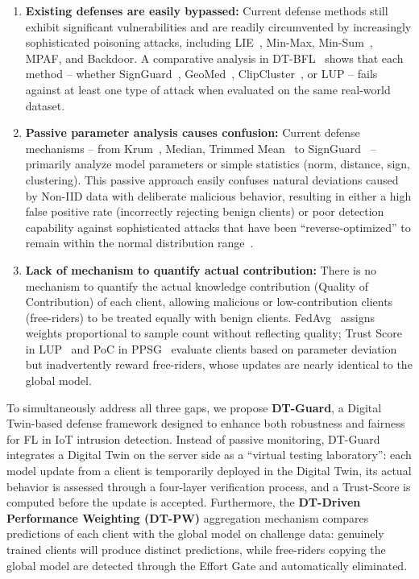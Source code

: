 \documentclass[runningheads]{llncs}
\begin{document}
\begin{enumerate}
    \item \textbf{Existing defenses are easily bypassed:} Current defense methods still exhibit significant vulnerabilities and are readily circumvented by increasingly sophisticated poisoning attacks, including LIE~\cite{baruch2019little}, Min-Max, Min-Sum~\cite{shejwalkar2021manipulating}, MPAF, and Backdoor. A comparative analysis in DT-BFL~\cite{issa2025dtbfl} shows that each method -- whether SignGuard~\cite{xu2022signguard}, GeoMed~\cite{pillutla2022robust}, ClipCluster~\cite{zeng2024clipcluster}, or LUP -- fails against at least one type of attack when evaluated on the same real-world dataset.

    \item \textbf{Passive parameter analysis causes confusion:} Current defense mechanisms -- from Krum~\cite{blanchard2017machine}, Median, Trimmed Mean~\cite{yin2018byzantine} to SignGuard~\cite{xu2022signguard} -- primarily analyze model parameters or simple statistics (norm, distance, sign, clustering). This passive approach easily confuses natural deviations caused by Non-IID data with deliberate malicious behavior, resulting in either a high false positive rate (incorrectly rejecting benign clients) or poor detection capability against sophisticated attacks that have been ``reverse-optimized'' to remain within the normal distribution range~\cite{baruch2019little, shejwalkar2021manipulating}.

    \item \textbf{Lack of mechanism to quantify actual contribution:} There is no mechanism to quantify the actual knowledge contribution (Quality of Contribution) of each client, allowing malicious or low-contribution clients (free-riders) to be treated equally with benign clients. FedAvg~\cite{mcmahan2016communication} assigns weights proportional to sample count without reflecting quality; Trust Score in LUP~\cite{issa2025dtbfl} and PoC in PPSG~\cite{zhang2025ppsg} evaluate clients based on parameter deviation but inadvertently reward free-riders, whose updates are nearly identical to the global model.
\end{enumerate}

To simultaneously address all three gaps, we propose \textbf{DT-Guard}, a Digital Twin-based defense framework designed to enhance both robustness and fairness for FL in IoT intrusion detection. Instead of passive monitoring, DT-Guard integrates a Digital Twin on the server side as a ``virtual testing laboratory'': each model update from a client is temporarily deployed in the Digital Twin, its actual behavior is assessed through a four-layer verification process, and a Trust-Score is computed before the update is accepted. Furthermore, the \textbf{DT-Driven Performance Weighting (DT-PW)} aggregation mechanism compares predictions of each client with the global model on challenge data: genuinely trained clients will produce distinct predictions, while free-riders copying the global model are detected through the Effort Gate and automatically eliminated.
\end{document}
